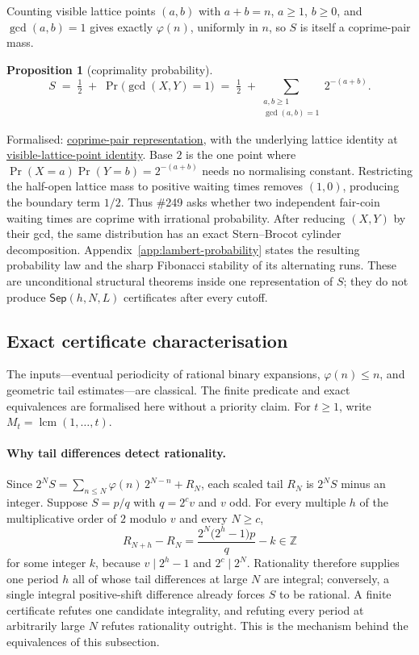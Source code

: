 \documentclass[11pt]{article}
\newcommand{\commit}{312b96c0d149ed466725c62d4ef24cfc91bca34e}
\newcommand{\repobase}{https://github.com/wcook04/plectis-lean-erdos249-257/blob/\commit}
\newcommand{\PK}{Erdos249257}
\newcommand{\lword}[4]{\href{\repobase/\PK/#1\#L#2}{#4}}
\newtheorem{proposition}[theorem]{Proposition}
\theoremstyle{definition}
\theoremstyle{remark}
\newcommand{\Z}{\mathbb{Z}}
\newcommand{\ph}{\varphi}
\newcommand{\lcm}{\operatorname{lcm}}
\begin{document}
Counting visible lattice points $(a,b)$ with $a+b=n$, $a\ge1$, $b\ge0$, and $\gcd(a,b)=1$ gives
exactly $\ph(n)$, uniformly in $n$, so $S$ is itself a coprime-pair mass.

\begin{proposition}[coprimality probability]\label{res:coprime}
\[
S \;=\; \tfrac12 \;+\; \Pr\!\big(\gcd(X,Y)=1\big)
\;=\; \tfrac12 \;+\!\!\sum_{\substack{a,b\ge1\\ \gcd(a,b)=1}}\!\! 2^{-(a+b)}.
\]
\end{proposition}
\noindent Formalised: \lword{CertificateKernel.lean}{18229}{totient_series_eq_half_add_visible_coprime_pairs}{coprime-pair representation},
with the underlying lattice identity at
\lword{CertificateKernel.lean}{18216}{tsum_visible_coprime_pairs_eq_totient_series}{visible-lattice-point identity}.
Base $2$ is the one point where $\Pr(X=a)\Pr(Y=b)=2^{-(a+b)}$ needs no normalising
constant.  Restricting the half-open lattice mass to positive waiting times
removes $(1,0)$, producing the boundary term $1/2$.  Thus \#249 asks whether two independent
fair-coin waiting times are coprime with irrational probability.
After reducing $(X,Y)$ by their gcd, the same distribution has an exact
Stern--Brocot cylinder decomposition.
Appendix~\ref{app:lambert-probability} states the resulting probability law
and the sharp Fibonacci stability of its alternating runs.  These are
unconditional structural theorems inside one representation of \(S\); they
do not produce \(\mathsf{Sep}(h,N,L)\) certificates after every cutoff.

\subsection{Exact certificate characterisation}\label{sec:reduction}

The inputs---eventual periodicity of rational binary expansions,
$\ph(n)\le n$, and geometric tail estimates---are classical.  The finite
predicate and exact equivalences are formalised here without a priority claim.
For $t\ge1$, write $M_t=\lcm(1,\ldots,t)$.

\paragraph{Why tail differences detect rationality.}
Since \(2^NS=\sum_{n\le N}\ph(n)\,2^{N-n}+R_N\), each scaled tail
\(R_N\) is \(2^NS\) minus an integer.  Suppose \(S=p/q\) with
\(q=2^cv\) and \(v\) odd.  For every multiple \(h\) of the
multiplicative order of \(2\) modulo \(v\) and every \(N\geq c\),
\[
 R_{N+h}-R_N
 =\frac{2^N\bigl(2^h-1\bigr)p}{q}-k
 \in\Z
\]
for some integer \(k\), because \(v\mid2^h-1\) and \(2^c\mid2^N\).
Rationality therefore supplies one period \(h\) all of whose tail
differences at large \(N\) are integral; conversely, a single integral
positive-shift difference already forces \(S\) to be rational.  A finite
certificate refutes one candidate integrality, and refuting every period
at arbitrarily large \(N\) refutes rationality outright.  This is the
mechanism behind the equivalences of this subsection.
\end{document}
